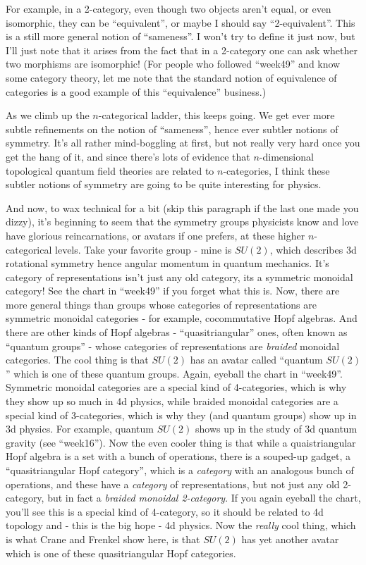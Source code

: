 \documentclass{article}
\begin{document}
For example, in a 2-category, even though two objects aren't equal, or
even isomorphic, they can be ``equivalent'', or maybe I should say
``2-equivalent''. This is a still more general notion of ``sameness''. I
won't try to define it just now, but I'll just note that it arises from
the fact that in a 2-category one can ask whether two morphisms are
isomorphic! (For people who followed ``week49'' and know some category
theory, let me note that the standard notion of equivalence of
categories is a good example of this ``equivalence'' business.)

As we climb up the \(n\)-categorical ladder, this keeps going. We get
ever more subtle refinements on the notion of ``sameness'', hence ever
subtler notions of symmetry. It's all rather mind-boggling at first, but
not really very hard once you get the hang of it, and since there's lots
of evidence that \(n\)-dimensional topological quantum field theories
are related to \(n\)-categories, I think these subtler notions of
symmetry are going to be quite interesting for physics.

And now, to wax technical for a bit (skip this paragraph if the last one
made you dizzy), it's beginning to seem that the symmetry groups
physicists know and love have glorious reincarnations, or avatars if one
prefers, at these higher \(n\)-categorical levels. Take your favorite
group - mine is \(SU(2)\), which describes 3d rotational symmetry hence
angular momentum in quantum mechanics. It's category of representations
isn't just any old category, its a symmetric monoidal category! See the
chart in ``week49'' if you forget what this is. Now, there are more
general things than groups whose categories of representations are
symmetric monoidal categories - for example, cocommutative Hopf
algebras. And there are other kinds of Hopf algebras -
``quasitriangular'' ones, often known as ``quantum groups'' - whose
categories of representations are \emph{braided} monoidal categories.
The cool thing is that \(SU(2)\) has an avatar called ``quantum
\(SU(2)\)'' which is one of these quantum groups. Again, eyeball the
chart in ``week49''. Symmetric monoidal categories are a special kind of
4-categories, which is why they show up so much in 4d physics, while
braided monoidal categories are a special kind of 3-categories, which is
why they (and quantum groups) show up in 3d physics. For example,
quantum \(SU(2)\) shows up in the study of 3d quantum gravity (see
``week16''). Now the even cooler thing is that while a quaistriangular
Hopf algebra is a set with a bunch of operations, there is a souped-up
gadget, a ``quasitriangular Hopf category'', which is a \emph{category}
with an analogous bunch of operations, and these have a \emph{category}
of representations, but not just any old 2-category, but in fact a
\emph{braided monoidal 2-category}. If you again eyeball the chart,
you'll see this is a special kind of 4-category, so it should be related
to 4d topology and - this is the big hope - 4d physics. Now the
\emph{really} cool thing, which is what Crane and Frenkel show here, is
that \(SU(2)\) has yet another avatar which is one of these
quasitriangular Hopf categories.
\end{document}
